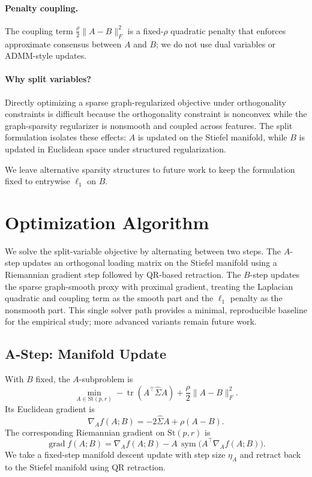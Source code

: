\documentclass[10pt,twocolumn,letterpaper]{article}
\theoremstyle{definition}
\newcommand{\stiefel}{\mathrm{St}}
\newcommand{\Sigmahat}{\widehat{\Sigma}}
\DeclareMathOperator{\tr}{tr}
\DeclareMathOperator{\sym}{sym}
\begin{document}
\paragraph{Penalty coupling.}
The coupling term $\frac{\rho}{2}\|A-B\|_F^2$ is a fixed-$\rho$ quadratic penalty that enforces approximate consensus between $A$ and $B$; we do not use dual variables or ADMM-style updates.

\paragraph{Why split variables?}
Directly optimizing a sparse graph-regularized objective under orthogonality constraints is difficult because the orthogonality constraint is nonconvex while the graph-sparsity regularizer is nonsmooth and coupled across features. The split formulation isolates these effects: $A$ is updated on the Stiefel manifold, while $B$ is updated in Euclidean space under structured regularization.

We leave alternative sparsity structures to future work to keep the formulation fixed to entrywise $\ell_1$ on $B$.

\section{Optimization Algorithm}
\label{sec:algorithm}

We solve the split-variable objective by alternating between two steps. The $A$-step updates an orthogonal loading matrix on the Stiefel manifold using a Riemannian gradient step followed by QR-based retraction. The $B$-step updates the sparse graph-smooth proxy with proximal gradient, treating the Laplacian quadratic and coupling term as the smooth part and the $\ell_1$ penalty as the nonsmooth part. This single solver path provides a minimal, reproducible baseline for the empirical study; more advanced variants remain future work.

\subsection{A-Step: Manifold Update}
With $B$ fixed, the $A$-subproblem is
\begin{equation}
\label{eq:A_subproblem}
\min_{A \in \stiefel(p,r)}
-\tr(A^\top \Sigmahat A)
+ \frac{\rho}{2}\|A-B\|_F^2.
\end{equation}
Its Euclidean gradient is
\begin{equation}
    \nabla_A f(A;B) = -2\Sigmahat A + \rho (A-B).
\end{equation}
The corresponding Riemannian gradient on $\stiefel(p,r)$ is
\begin{equation}
    \operatorname{grad} f(A;B)
    = \nabla_A f(A;B) - A\,\sym\!\big(A^\top \nabla_A f(A;B)\big).
\end{equation}
We take a fixed-step manifold descent update with step size $\eta_A$ and retract back to the Stiefel manifold using QR retraction.
\end{document}
